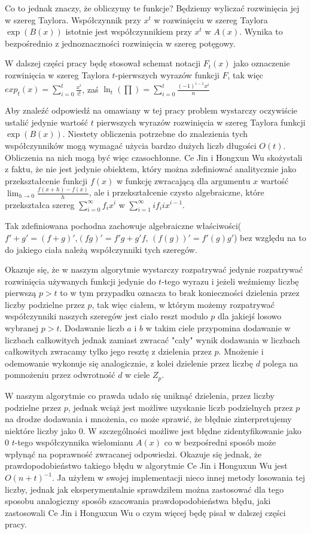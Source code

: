 \documentclass{article}
\begin{document}
Co to jednak znaczy, że obliczymy te funkcje? Będziemy wyliczać rozwinięcia jej w szereg Taylora.
Współczynnik przy $x^t$ w rozwinięciu w szereg Taylora $\exp(B(x))$ istotnie jest współczynnikiem
przy $x^t$ w $A(x)$. Wynika to bezpośrednio z jednoznaczności rozwinięcia w szereg potęgowy. 

W dalszej części pracy będę stosował schemat notacji $F_t(x)$ jako oznaczenie rozwinięcia w szereg Taylora 
$t$-pierwszych wyrazów funkcji $F$, tak więc $exp_t(x) = \sum_{i=0}^t\frac{x^i}{i!}$, zaś 
$\ln_t(\prod)=\sum_{i=0}^t\frac{(-1)^{i-1}x^i}{n}$ 

Aby znaleźć odpowiedź na omawiany w tej pracy problem wystarczy oczywiście ustalić jedynie 
wartość $t$ pierwszych wyrazów rozwinięcia w szereg Taylora funkcji $\exp(B(x))$. 
Niestety obliczenia potrzebne do znalezienia tych współczynników mogą wymagać użycia bardzo dużych liczb długości $O(t)$. 
Obliczenia na nich mogą być więc czasochłonne. Ce Jin i Hongxun Wu skożystali z faktu, że
nie jest jedynie obiektem, który można zdefiniować analitycznie jako przekształcenie funkcji 
$f(x)$ w funkcję zwracającą dla argumentu $x$ wartość $\lim_{h \to 0}\frac{f(x+h)-f(x)}{h}$, ale 
i przekształcenie czysto algebraiczne, które przekształca szereg $\sum_{i=0}^{\infty}f_i x^i$ w
$\sum_{i=1}^{\infty}if_{i}ix^{i-1}$. 

Tak zdefiniowana pochodna zachowuje algebraiczne właściwości($f'+g'=(f+g)'$,$(fg)'=f'g+g'f$,
$(f(g))'=f'(g)g'$) bez względu na to do jakiego ciała należą współczynniki tych szeregów. 

Okazuje się, że w naszym algorytmie wystarczy rozpatrywać jedynie rozpatrywać rozwinięcia używanych 
funkcji jedynie do $t$-tego wyrazu i jeżeli weźmiemy liczbę pierwszą $p>t$ to w tym przypadku
oznacza to brak konieczności dzielenia przez liczby podzielne przez $p$, tak więc ciałem, w 
którym możemy rozpatrywać współczynniki naszych szeregów jest ciało reszt modulo $p$ dla jakiejś losowo wybranej $p>t$. Dodawanie liczb $a$ i $b$ w takim ciele przypomina dodawanie w liczbach całkowitych jednak zamiast zwracać "cały" wynik dodawania w liczbach całkowitych
zwracamy tylko jego resztę z dzielenia przez $p$. Mnożenie i odemowanie wykonuje się 
analogicznie, z kolei dzielenie przez liczbę $d$ polega na pomnożeniu przez odwrotność
$d$ w ciele $Z_p$.

W naszym algorytmie co prawda udało się uniknąć dzielenia, przez liczby podzielne przez $p$,
jednak wciąż jest możliwe uzyskanie liczb podzielnych przez $p$ na drodze dodawania i mnożenia, co może sprawić, że błędnie zinterpretujemy niektóre liczby jako $0$. W szczególności możliwe jest błędne zidentyfikowanie jako $0$ $t$-tego współczynnika wielomianu 
$A(x)$ co w bezpośredni sposób może wpłynąć na poprawność zwracanej odpowiedzi. Okazuje się
jednak, że prawdopodobieństwo takiego błędu w algorytmie Ce Jin i Honguxun Wu jest $O(n+t)^{-1}$. Ja użyłem w swojej implementacji nieco innej metody losowania tej liczby, jednak jak
eksperymentalnie sprawdziłem można zastosować dla tego sposobu analogiczny sposób szacowania prawdopodobieństwa błędu, jaki zastosowali Ce Jin i Honguxun Wu o czym więcej będę pisał w dalszej części pracy.
\end{document}

